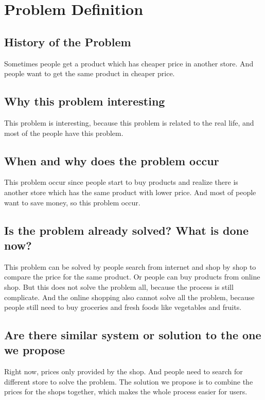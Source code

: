 \documentclass[12pt]{article}
\title{}
\author{Qingyue Zhu }
\date{May 2017}
\begin{document}
\maketitle

\section*{Problem Definition}
\subsection*{History of the Problem}
Sometimes people get a product which has cheaper price in another store. And people want to get the same product in cheaper price.

\subsection*{Why this problem interesting}
This problem is interesting, because this problem is related to the real life, and most of the people have this problem. 

\subsection*{When and why does the problem occur}
This problem occur since people start to buy products and realize there is another store which has the same product with lower price. And most of people want to save money, so this problem occur.

\subsection*{Is the problem already solved? What is done now?}
This problem can be solved by people search from internet and shop by shop to compare the price for the same product. Or people can buy products from online shop. But this does not solve the problem all, because the process is still complicate. And the online shopping also cannot solve all the problem, because people still need to buy groceries and fresh foods like vegetables and fruits.

\subsection*{Are there similar system or solution to the one we propose}
Right now, prices only provided by the shop. And people need to search for different store to solve the problem. The solution we propose is to combine the prices for the shops together, which makes the whole process easier for users.
\end{document}

